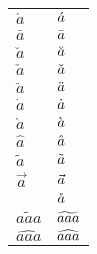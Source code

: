 \documentclass{article}
\begin{document}
\begin{tabular}{ll}
$\acute{a}$ & $\mathaccent"7013{a}$ \\
$\bar{a}$   & $\mathaccent"7016{a}$ \\
$\breve{a}$ & $\mathaccent"7015{a}$ \\
$\check{a}$ & $\mathaccent"7014{a}$ \\
$\ddot{a}$  & $\mathaccent"707F{a}$ \\
$\dot{a}$   & $\mathaccent"705F{a}$ \\
$\grave{a}$ & $\mathaccent"7012{a}$ \\
$\hat{a}$   & $\mathaccent"705E{a}$ \\
$\tilde{a}$ & $\mathaccent"707E{a}$ \\
$\vec{a}$   & $\mathaccent"017E{a}$ \\
            & $\mathaccent"7017{a}$ \\
$\widetilde{aaa}$   & $\mathaccent"0365{aaa}$ \\
$\widehat{aaa}$     & $\mathaccent"0362{aaa}$ \\
\end{tabular}
\end{document}
